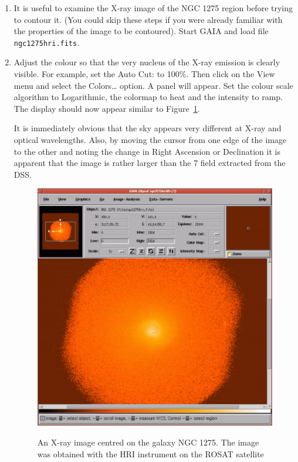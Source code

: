\documentclass[twoside,11pt]{starlink}
\providecommand{\arcmin} {\raisebox{-0.5ex}{$^{'}$} }
\begin{document}
\begin{enumerate}

  \item It is useful to examine the X-ray image of the NGC 1275 region
   before trying to contour it.  (You could skip these steps if you
   were already familiar with the properties of the image to be contoured).
   Start GAIA and load file \texttt{ngc1275hri.fits}.

  \item Adjust the colour so that the very nucleus of the X-ray emission
   is clearly visible.  For example, set the \textsf{Auto Cut:} to 100\%.
   Then click on the \textsf{View} menu and select the \textsf{Colors\ldots} option.  A panel will appear.  Set the colour scale
   algorithm to \textsf{Logarithmic}, the colormap to \textsf{heat} and the
   intensity to \textsf{ramp}.  The display should now appear similar to
   Figure~\ref{SUPER_R_HRI}.

   It is immediately obvious that the sky appears very different at X-ray
   and optical wavelengths.  Also, by moving the cursor from one edge of
   the image to the other and noting the change in Right Ascension or
   Declination it is apparent that the image is rather larger than the
   7\arcmin field extracted from the DSS.

  \begin{figure}[htbp]
     \centering
     \includegraphics[totalheight=6in]{sc17_super_r_hri}
     \begin{quote}
     \caption[An X-ray image of NGC 1275]
      {An X-ray image centred on the galaxy NGC 1275.  The image was
      obtained with the HRI instrument on the ROSAT satellite
     \label{SUPER_R_HRI} }
     \end{quote}
  \end{figure}


\end{enumerate}
\end{document}
